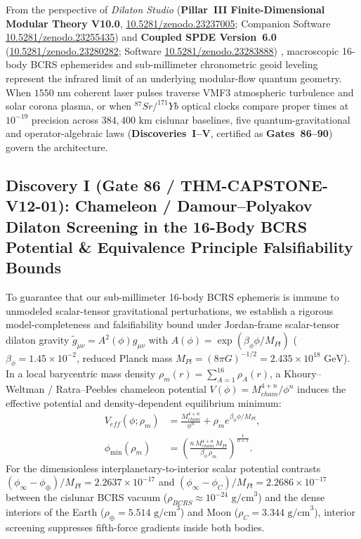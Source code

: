 \documentclass[11pt,a4paper,reqno]{article}
\def\bm#1{#1}%
\def\texttt#1{#1}%
\def\mathrm#1{#1}%
\def\mathbb#1{#1}%
\newcommand{\zenodo}[1]{\href{https://doi.org/10.5281/zenodo.#1}{\texttt{10.5281/\allowbreak zenodo.#1}}}
\theoremstyle{plain}
\theoremstyle{definition}
\theoremstyle{remark}
\numberwithin{equation}{section}
\begin{document}
From the perspective of \emph{Dilaton Studio} (\textbf{Pillar~III Finite-Dimensional Modular Theory V10.0}, \zenodo{23237005}; Companion Software \zenodo{23255435}) \cite{PillarIII_Finite_v10} and \textbf{Coupled SPDE Version~6.0} (\zenodo{23280282}; Software \zenodo{23283888}) \cite{PillarI_SPDE_v6}, macroscopic 16-body BCRS ephemerides and sub-millimeter chronometric geoid leveling represent the infrared limit of an underlying modular-flow quantum geometry. When $1550\text{ nm}$ coherent laser pulses traverse VMF3 atmospheric turbulence and solar corona plasma, or when $^{87}\mathrm{Sr}/^{171}\mathrm{Yb}$ optical clocks compare proper times at $10^{-19}$ precision across $384,400\text{ km}$ cislunar baselines, five quantum-gravitational and operator-algebraic laws (\textbf{Discoveries~I--V}, certified as \textbf{Gates~86--90}) govern the architecture.

\subsection{\texorpdfstring{Discovery I (\texttt{Gate 86 / THM-CAPSTONE-V12-01}): Chameleon / Damour--Polyakov Dilaton Screening in the 16-Body BCRS Potential \& Equivalence Principle Falsifiability Bounds}{Discovery I (Gate 86 / THM-CAPSTONE-V12-01): Chameleon / Damour-Polyakov Dilaton Screening in the 16-Body BCRS Potential and Equivalence Principle Falsifiability Bounds}}
To guarantee that our sub-millimeter 16-body BCRS ephemeris is immune to unmodeled scalar-tensor gravitational perturbations, we establish a rigorous model-completeness and falsifiability bound under Jordan-frame scalar-tensor dilaton gravity $\tilde{g}_{\mu\nu} = A^2(\phi)g_{\mu\nu}$ with $A(\phi) = \exp(\beta_\phi \phi / M_{\mathrm{Pl}})$ ($\beta_\phi = 1.45 \times 10^{-2}$, reduced Planck mass $M_{\mathrm{Pl}} = (8\pi G)^{-1/2} = 2.435 \times 10^{18}\text{ GeV}$). In a local barycentric mass density $\rho_m(\bm{r}) = \sum_{A=1}^{16}\rho_A(\bm{r})$, a Khoury--Weltman / Ratra--Peebles chameleon potential $V(\phi) = M_{\mathrm{cham}}^{4+n} / \phi^n$ induces the effective potential and density-dependent equilibrium minimum:
\begin{align}
\label{eq:dilaton_effective_potential}
  V_{\mathrm{eff}}(\phi; \rho_m) &= \frac{M_{\mathrm{cham}}^{4+n}}{\phi^n} + \rho_m e^{\beta_\phi \phi / M_{\mathrm{Pl}}}, \\[1ex]
\label{eq:dilaton_equilibrium}
  \phi_{\min}(\rho_m) &= \left( \frac{n\,M_{\mathrm{cham}}^{4+n}\,M_{\mathrm{Pl}}}{\beta_\phi\,\rho_m} \right)^{\!\frac{1}{n+1}}.
\end{align}
For the dimensionless interplanetary-to-interior scalar potential contrasts $(\phi_\infty - \phi_\oplus)/M_{\mathrm{Pl}} = 2.2637 \times 10^{-17}$ and $(\phi_\infty - \phi_{\mathbb{C}})/M_{\mathrm{Pl}} = 2.2686 \times 10^{-17}$ between the cislunar BCRS vacuum ($\rho_{\mathrm{BCRS}} \approx 10^{-24}\text{ g/cm}^3$) and the dense interiors of the Earth ($\rho_\oplus = 5.514\text{ g/cm}^3$) and Moon ($\rho_{\mathbb{C}} = 3.344\text{ g/cm}^3$), interior screening suppresses fifth-force gradients inside both bodies.
\end{document}
